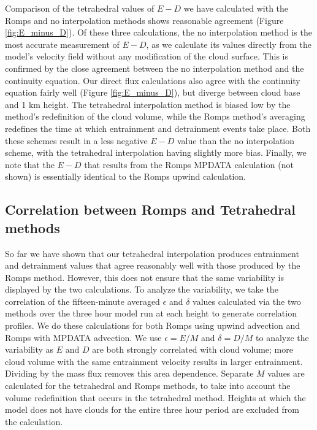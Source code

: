 \documentclass[12pt]{article}
\begin{document}
Comparison of the tetrahedral values of $E-D$ we have calculated with the
Romps and no interpolation methods shows reasonable agreement (Figure 
\ref{fig:E_minus_D}).  Of these three calculations, the no interpolation method 
is the most accurate measurement of $E-D$, as we calculate its values directly 
from the model's velocity field without any modification of the cloud surface.
This is confirmed by the close agreement between the no interpolation method 
and the continuity equation.  Our direct flux calculations also agree with the 
continuity equation fairly well (Figure \ref{fig:E_minus_D}), but diverge 
between cloud base and 1 km height.  The tetrahedral interpolation method is 
biased low by the method's redefinition of the cloud volume, while the Romps 
method's averaging redefines the time at which entrainment and detrainment 
events take place.  Both these schemes result in a less negative $E-D$ value 
than the no interpolation scheme, with the tetrahedral interpolation having 
slightly more bias.  Finally, we note that the $E-D$ that results from the 
Romps MPDATA calculation (not shown) is essentially identical to the Romps 
upwind calculation.


\subsection{Correlation between Romps and Tetrahedral methods}

So far we have shown that our tetrahedral interpolation produces entrainment 
and detrainment values that agree reasonably well with those produced by the 
Romps method.  However, this does not ensure that the same variability is 
displayed by the two calculations.  To analyze the variability, we take the 
correlation of the fifteen-minute averaged $\epsilon$ and $\delta$ values 
calculated via the two methods over the three hour model run at each height 
to generate correlation profiles.  We do these calculations for both Romps 
using upwind advection and Romps with MPDATA advection.  We use 
$\epsilon = E/M$ and $\delta = D/M$ to analyze the variability as $E$ and $D$ 
are both strongly correlated with cloud volume; more cloud volume with the same 
entrainment velocity results in larger entrainment.  Dividing by the mass flux 
removes this area dependence.  Separate $M$ values are calculated for the
tetrahedral and Romps methods, to take into account the volume redefinition 
that occurs in the tetrahedral method.  Heights at which the model does not 
have clouds for the entire three hour period are excluded from the calculation.  
\end{document}
